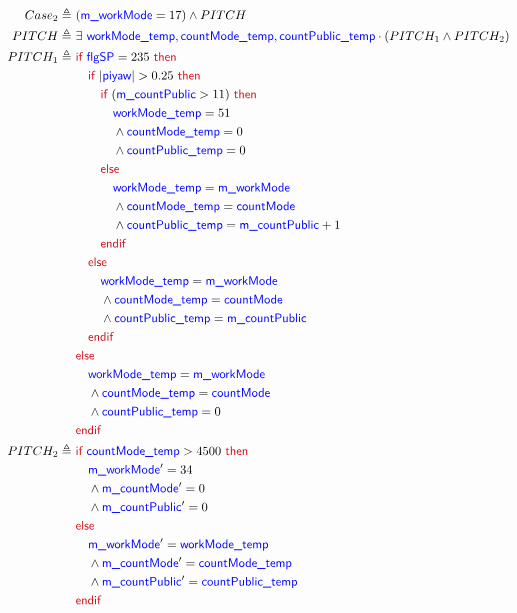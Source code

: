 \documentclass[fleqn,a4paper]{article}
\newcommand\Var[1]{\textcolor{blue}{\textsf{#1}}}
\newcommand\syntax[1]{\textcolor[RGB]{202,12,22}{\textsf{#1}}}
\newcommand\definedby{\triangleq}
\begin{document}
\begin{description}
\begin{align*}
Case_2 \definedby \
& (\Var{m\_workMode} = 17) \wedge PITCH \\
PITCH \definedby \
& \exists \ \Var{workMode\_temp}, \Var{countMode\_temp}, \Var{countPublic\_temp} \cdot ( PITCH_1 \wedge PITCH_2 ) \\
PITCH_1 \definedby \
& \syntax{if } \Var{flgSP} = 235 \syntax{ then} \\
& \quad \syntax{if } |\Var{piyaw}| > 0.25 \syntax{ then} \\
& \quad \quad \syntax{if } (\Var{m\_countPublic} > 11) \syntax{ then} \\
& \quad \quad \quad \Var{workMode\_temp} = 51 \\
& \quad \quad \quad \wedge \Var{countMode\_temp} = 0 \\
& \quad \quad \quad \wedge \Var{countPublic\_temp} = 0 \\
& \quad \quad \syntax{else} \\
& \quad \quad \quad \Var{workMode\_temp} = \Var{m\_workMode} \\
& \quad \quad \quad \wedge \Var{countMode\_temp} = \Var{countMode} \\
& \quad \quad \quad \wedge \Var{countPublic\_temp} = \Var{m\_countPublic} + 1 \\
& \quad \quad \syntax{endif} \\
& \quad \syntax{else} \\
& \quad \quad \Var{workMode\_temp} = \Var{m\_workMode} \\
& \quad \quad \wedge \Var{countMode\_temp} = \Var{countMode} \\
& \quad \quad \wedge \Var{countPublic\_temp} = \Var{m\_countPublic} \\
& \quad \syntax{endif} \\
& \syntax{else} \\
& \quad \Var{workMode\_temp} = \Var{m\_workMode} \\
& \quad \wedge \Var{countMode\_temp} = \Var{countMode} \\
& \quad \wedge \Var{countPublic\_temp} = 0 \\
& \syntax{endif} \\
PITCH_2 \definedby \
& \syntax{if } \Var{countMode\_temp} > 4500 \syntax{ then} \\
& \quad \Var{m\_workMode}' = 34 \\
& \quad \wedge \Var{m\_countMode}' = 0 \\
& \quad \wedge \Var{m\_countPublic}' = 0 \\
& \syntax{else} \\
& \quad \Var{m\_workMode}' = \Var{workMode\_temp} \\
& \quad \wedge \Var{m\_countMode}' = \Var{countMode\_temp} \\
& \quad \wedge \Var{m\_countPublic}' = \Var{countPublic\_temp} \\
& \syntax{endif}
\end{align*}


\end{description}
\end{document}
